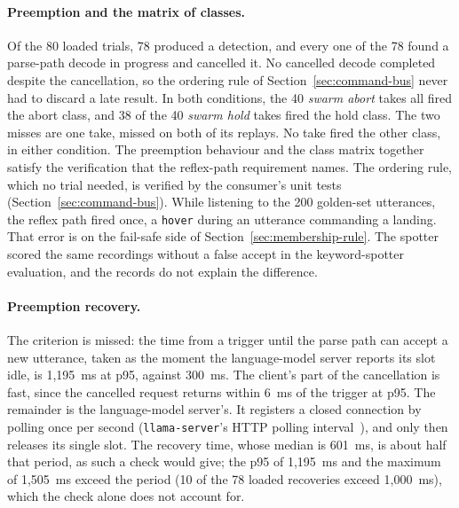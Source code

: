 \paragraph{Preemption and the matrix of classes.} Of the 80 loaded trials, 78 produced a
detection, and every one of the 78 found a parse-path decode in progress and cancelled it. No
cancelled decode completed despite the cancellation, so the ordering rule of
Section~\ref{sec:command-bus} never had to discard a late result. In both conditions, the 40
\emph{swarm abort} takes all fired the abort class, and 38 of the 40 \emph{swarm hold} takes fired
the hold class. The two misses are one take, missed on both of its replays. No take fired the other
class, in either condition. The preemption behaviour and the class matrix together satisfy the
verification that the reflex-path requirement names. The ordering rule, which no trial needed, is
verified by the consumer's unit tests (Section~\ref{sec:command-bus}). While listening to the 200 golden-set
utterances, the reflex path fired once, a \texttt{hover} during an utterance commanding a landing.
That error is on the fail-safe side of Section~\ref{sec:membership-rule}. The spotter scored the
same recordings without a false accept in the keyword-spotter evaluation, and the records do not
explain the difference.

\paragraph{Preemption recovery.} The criterion is missed: the time from a trigger until the parse
path can accept a new utterance, taken as the moment the language-model server reports its slot
idle, is 1{,}195~ms at p95, against 300~ms. The client's part of the cancellation is fast, since the
cancelled request returns within 6~ms of the trigger at p95. The remainder is the language-model
server's. It registers a closed connection by polling once per second (\texttt{llama-server}'s HTTP
polling interval~\cite{llamacpp}), and only then releases its single slot. The recovery time, whose
median is 601~ms, is about half that period, as such a check would give; the p95 of 1{,}195~ms and
the maximum of 1{,}505~ms exceed the period (10 of the 78 loaded recoveries exceed 1{,}000~ms),
which the check alone does not account for.

